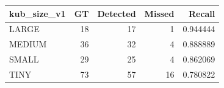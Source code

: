\begin{tabular}{lrrrr}
\toprule
kub_size_v1 & GT & Detected & Missed & Recall \\
\midrule
LARGE & 18 & 17 & 1 & 0.944444 \\
MEDIUM & 36 & 32 & 4 & 0.888889 \\
SMALL & 29 & 25 & 4 & 0.862069 \\
TINY & 73 & 57 & 16 & 0.780822 \\
\bottomrule
\end{tabular}
